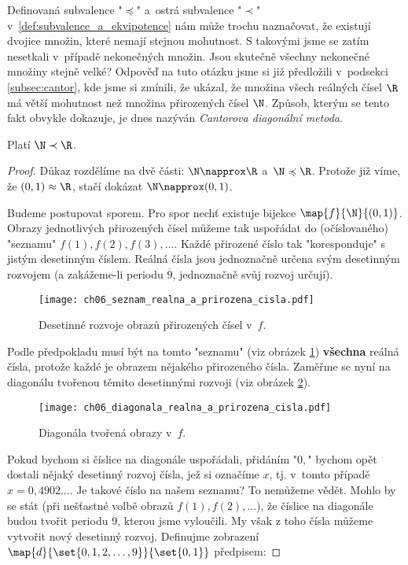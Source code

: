 Definovaná subvalence "$\preccurlyeq$" a~ostrá subvalence "$\prec$" v~\ref{def:subvalence_a_ekvipotence} nám může trochu naznačovat, že existují dvojice množin, které nemají stejnou mohutnost. S takovými jsme se zatím nesetkali v~případě nekonečných množin. Jsou skutečně všechny nekonečné množiny stejně velké? Odpověď na tuto otázku jsme si již předložili v~podsekci \ref{subsec:cantor}, kde jsme si zmínili, že  ukázal, že množina všech reálných čísel $\R$ má větší mohutnost než množina přirozených čísel $\N$. Způsob, kterým se tento fakt obvykle dokazuje, je dnes nazýván \emph{Cantorova diagonální metoda}.
\begin{theorem}\label{thm:N_a_R}
    Platí $\N\prec\R$.
\end{theorem}
\begin{proof}
    Důkaz rozdělíme na dvě části: $\N\napprox\R$ a~$\N\preccurlyeq\R$. Protože již víme, že $(0,1)\approx\R$, stačí dokázat $\N\napprox(0,1)$.\par
    Budeme postupovat sporem. Pro spor nechť existuje bijekce $\map{f}{\N}{(0,1)}$. Obrazy jednotlivých přirozených čísel můžeme tak uspořádat do (očíslovaného) "seznamu" $f(1),f(2),f(3),\dots$. Každé přirozené číslo tak "koresponduje" s jistým desetinným číslem. Reálná čísla jsou jednoznačně určena svým desetinným rozvojem (a zakážeme-li periodu $\overline{9}$, jednoznačně svůj rozvoj určují).
    \begin{figure}[H]
        \centering
        \texttt{[image: ch06\_seznam\_realna\_a\_prirozena\_cisla.pdf]}
        \caption{Desetinné rozvoje obrazů přirozených čísel v~$f$.}
        \label{fig:seznam_realna_a_prirozena_cisla}
    \end{figure}
    Podle předpokladu musí být na tomto "seznamu" (viz obrázek \ref{fig:seznam_realna_a_prirozena_cisla}) \textbf{všechna} reálná čísla, protože každé je obrazem nějakého přirozeného čísla. Zaměřme se nyní na diagonálu tvořenou těmito desetinnými rozvoji (viz obrázek \ref{fig:diagonala_realna_a_prirozena_cisla}).
    \begin{figure}[H]
        \centering
        \texttt{[image: ch06\_diagonala\_realna\_a\_prirozena\_cisla.pdf]}
        \caption{Diagonála tvořená obrazy v~$f$.}
        \label{fig:diagonala_realna_a_prirozena_cisla}
    \end{figure}
    Pokud bychom si číslice na diagonále uspořádali, přidáním "$0,$" bychom opět dostali nějaký desetinný rozvoj čísla, jež si označíme $x$, tj. v~tomto případě $x=0,4902\dots$. Je takové číslo na našem seznamu? To nemůžeme vědět. Mohlo by se stát (při nešťastné volbě obrazů $f(1),f(2),\dots$), že číslice na diagonále budou tvořit periodu $\overline{9}$, kterou jsme vyloučili. My však z toho čísla můžeme vytvořit nový desetinný rozvoj. Definujme zobrazení $\map{d}{\set{0,1,2,\dots,9}}{\set{0,1}}$ předpisem:

\end{proof}
